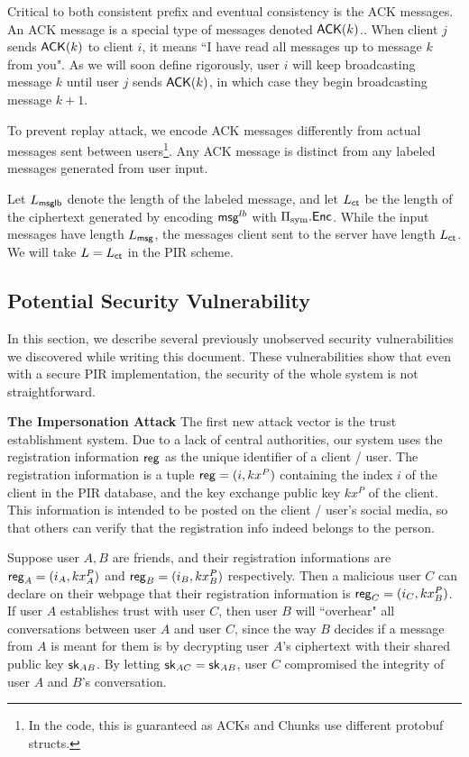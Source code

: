 Critical to both consistent prefix and eventual consistency is the ACK messages. An ACK message is a special type of messages denoted $\mathsf{ACK}(k)$.. When client $j$ sends $\mathsf{ACK}(k)$ to client $i$, it means ``I have read all messages up to message $k$ from you". As we will soon define rigorously, user $i$ will keep broadcasting message $k$ until user $j$ sends $\mathsf{ACK}(k)$, in which case they begin broadcasting message $k + 1$. 

To prevent replay attack, we encode ACK messages differently from actual messages sent between users\footnote{In the code, this is guaranteed as ACKs and Chunks use different protobuf structs.}. Any ACK message is distinct from any labeled messages generated from user input.

Let $L_{\mathsf{msglb}}$ denote the length of the labeled message, and let $L_{\mathsf{ct}}$ be the length of the ciphertext generated by encoding $\mathsf{msg}^{lb}$ with $\Pi_{\text{sym}}.\mathsf{Enc}$. While the input messages have length $L_{\mathsf{msg}}$, the messages client sent to the server have length $L_{\mathsf{ct}}$. We will take $L = L_{\mathsf{ct}}$ in the PIR scheme.
\subsection{Potential Security Vulnerability}
In this section, we describe several previously unobserved security vulnerabilities we discovered while writing this document. These vulnerabilities show that even with a secure PIR implementation, the security of the whole system is not straightforward.

\textbf{The Impersonation Attack} The first new attack vector is the trust establishment system. Due to a lack of central authorities, our system uses the registration information $\mathsf{reg}$ as the unique identifier of a client / user. The registration information is a tuple $\mathsf{reg} = (i, kx^P)$ containing the index $i$ of the client in the PIR database, and the key exchange public key $kx^P$ of the client. This information is intended to be posted on the client / user's social media, so that others can verify that the registration info indeed belongs to the person.

Suppose user $A, B$ are friends, and their registration informations are $\mathsf{reg}_A = (i_A, kx^P_A)$ and $\mathsf{reg}_B = (i_B, kx^P_B)$ respectively. Then a malicious user $C$ can declare on their webpage that their registration information is $\mathsf{reg}_C = (i_C, kx^P_B)$. If user $A$ establishes trust with user $C$, then user $B$ will ``overhear" all conversations between user $A$ and user $C$, since the way $B$ decides if a message from $A$ is meant for them is by decrypting user $A$'s ciphertext with their shared public key ${\mathsf{sk}}_{AB}$. By letting ${\mathsf{sk}}_{AC} = {\mathsf{sk}}_{AB}$, user $C$ compromised the integrity of user $A$ and $B$'s conversation.

